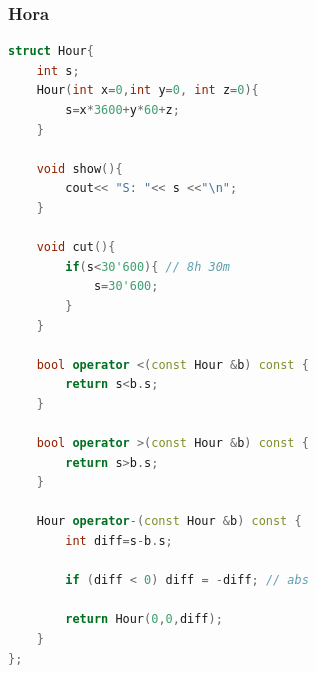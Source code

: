 \subsubsection{Hora}
\begin{lstlisting}[style=mystyle, language=C++]
struct Hour{
	int s;
	Hour(int x=0,int y=0, int z=0){
		s=x*3600+y*60+z;
	}

	void show(){
		cout<< "S: "<< s <<"\n";
	}

	void cut(){
		if(s<30'600){ // 8h 30m
			s=30'600;
		}
	}

	bool operator <(const Hour &b) const {
		return s<b.s;
	}

	bool operator >(const Hour &b) const {
		return s>b.s;
	}

	Hour operator-(const Hour &b) const {
		int diff=s-b.s;

		if (diff < 0) diff = -diff; // abs

		return Hour(0,0,diff);
	}
};
\end{lstlisting}
